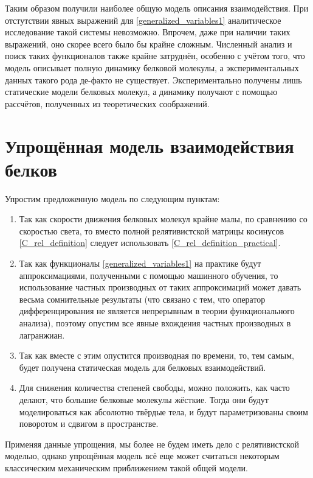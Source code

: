 Таким образом получили наиболее общую модель описания взаимодействия. При отстутствии явных выражений для \ref{generalized_variables1} аналитическое исследование такой системы невозможно. Впрочем, даже при наличии таких выражений, оно скорее всего было бы крайне сложным. Численный анализ и поиск таких функционалов также крайне затруднён, особенно с учётом того, что модель описывает полную динамику белковой молекулы, а экспериментальных данных такого рода де-факто не существует. Экспериментально получены лишь статические модели белковых молекул, а динамику получают с помощью рассчётов, полученных из теоретических соображений.

\section{Упрощённая модель взаимодействия белков}
Упростим предложенную модель по следующим пунктам:
\begin{enumerate}
\item Так как скорости движения белковых молекул крайне малы, по сравнению со скоростью света, то вместо полной релятивистской матрицы косинусов \ref{C_rel_definition} следует
использовать \ref{C_rel_definition_practical}.
\item Так как функционалы \ref{generalized_variables1} на практике будут аппроксимациями, полученными с помощью машинного обучения, то использование частных
производных от таких аппроксимаций может давать весьма сомнительные результаты (что связано с тем, что оператор дифференцирования не является непрерывным в теории функционального анализа), поэтому
опустим все явные вхождения частных производных в лагранжиан.
\item Так как вместе с этим опустится производная по времени, то, тем самым, будет получена статическая модель для белковых взаимодействий.
\item Для снижения количества степеней свободы, можно положить, как часто делают, что большие белковые молекулы жёсткие. Тогда они будут моделироваться как
абсолютно твёрдые тела, и будут параметризованы своим поворотом и сдвигом в пространстве.
\end{enumerate}
Применяя данные упрощения, мы более не будем иметь дело с релятивистской моделью, однако упрощённая модель всё еще может считаться некоторым
классическим механическим приближением такой общей модели.

